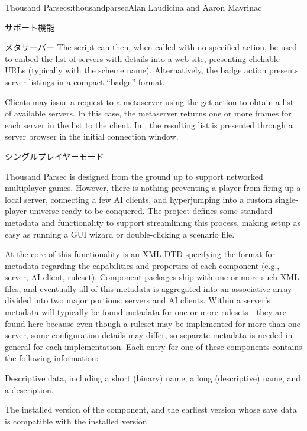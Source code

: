 \begin{aosachapter}{Thousand Parsec}{s:thousandparsec}{Alan Laudicina and Aaron Mavrinac}
\begin{aosasect1}{サポート機能}
\begin{aosasect2}{メタサーバー}
The script can then, when called with no specified action, be used to
embed the list of servers with details into a web site, presenting
clickable URLs (typically with the  scheme
name). Alternatively, the badge action presents server listings in a
compact ``badge'' format.

Clients may issue a request to a metaserver using the get action to
obtain a list of available servers. In this case, the metaserver
returns one or more  frames for each server in the list to
the client. In , the resulting list is presented
through a server browser in the initial connection window.

\end{aosasect2}

\begin{aosasect2}{シングルプレイヤーモード}

Thousand Parsec is designed from the ground up to support networked
multiplayer games. However, there is nothing preventing a player from
firing up a local server, connecting a few AI clients, and
hyperjumping into a custom single-player universe ready to be
conquered. The project defines some standard metadata and
functionality to support streamlining this process, making setup as
easy as running a GUI wizard or double-clicking a scenario file.

At the core of this functionality is an XML DTD specifying the format
for metadata regarding the capabilities and properties of each
component (e.g., server, AI client, ruleset). Component packages ship
with one or more such XML files, and eventually all of this metadata
is aggregated into an associative array divided into two major
portions: servers and AI clients. Within a server's metadata will
typically be found metadata for one or more rulesets---they are found
here because even though a ruleset may be implemented for more than
one server, some configuration details may differ, so
separate metadata is needed in general for each implementation.
Each entry for one of these components contains the following information:

\begin{aosaitemize}

  \item Descriptive data, including a short (binary) name, a long
  (descriptive) name, and a description.

  \item The installed version of the component, and the earliest
  version whose save data is compatible with the installed version.


\end{aosaitemize}
\end{aosasect2}
\end{aosasect1}
\end{aosachapter}
